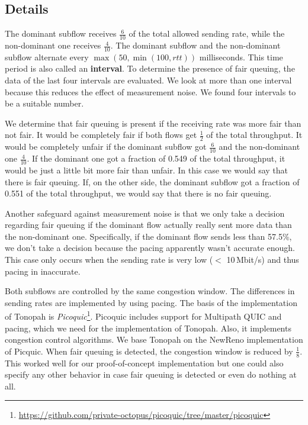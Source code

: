 \documentclass[conference]{IEEEtran}
\begin{document}
\subsection{Details}

The dominant subflow receives $\frac{6}{10}$ of the total allowed sending rate, while the non-dominant one receives $\frac{4}{10}$. 
The dominant subflow and the non-dominant subflow alternate every $\max{(50, \min{(100, \textit{rtt})})}$ milliseconds. 
This time period is also called an \textbf{interval}. To determine the presence of fair queuing, the data of the last four intervals are evaluated. 
We look at more than one interval because this reduces the effect of measurement noise. We found four intervals to be a suitable number. 

We determine that fair queuing is present if the receiving rate was more fair than not fair. 
It would be completely fair if both flows get $\frac{1}{2}$ of the total throughput. It would be completely unfair if the dominant subflow got $\frac{6}{10}$ and the non-dominant one $\frac{4}{10}$. 
If the dominant one got a fraction of 0.549 of the total throughput, it would be just a little bit more fair than unfair. In this case we would say that there is fair queuing. 
If, on the other side, the dominant subflow got a fraction of 0.551 of the total throughput, we would say that there is no fair queuing. 

Another safeguard against measurement noise is that we only take a decision regarding fair queuing if the dominant flow actually really sent more data than the non-dominant one. 
Specifically, if the dominant flow sends less than 57.5\%, we don't take a decision because the pacing apparently wasn't accurate enough. 
This case only occurs when the sending rate is very low ($<$ 10\,Mbit/s) and thus pacing in inaccurate. 

Both subflows are controlled by the same congestion window. The differences in sending rates are implemented by using pacing. 
The basis of the implementation of Tonopah is \textit{Picoquic}\footnote{\url{https://github.com/private-octopus/picoquic/tree/master/picoquic}}. 
Picoquic includes support for Multipath QUIC and pacing, which we need for the implementation of Tonopah. Also, it implements congestion control algorithms. 
We base Tonopah on the NewReno implementation of Picquic. When fair queuing is detected, the congestion window is reduced by $\frac{1}{8}$. 
This worked well for our proof-of-concept implementation but one could also specify any other behavior in case fair queuing is detected or even do nothing at all. 
\end{document}
